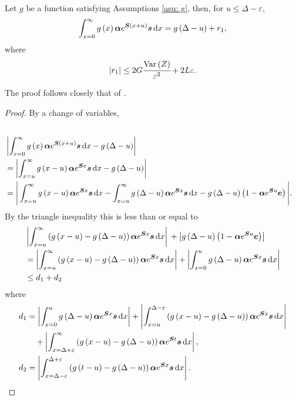 \begin{lem}\label{lemma:bound}
	Let \(g\) be a function satisfying Assumptions \ref{asu: g}, then, for \(u \leq \Delta - \varepsilon\), 
	\begin{align*}
		\int_{x=0}^\infty g\left(x\right)\boldsymbol \alpha e^{\boldsymbol{S}\left(x+u\right)} \boldsymbol s \, \mathrm{d} x = g\left(\Delta-u\right) + r_1,
	\end{align*}
	where 
	\[\left|r_1\right|\leq 2G\cfrac{\mathrm{Var} \left(Z\right)}{\varepsilon^2} + 2L\varepsilon.\]
\end{lem}
The proof follows closely that of \cite[Appendix A, Theorem 4]{hht2020}.
\begin{proof}
	By a change of variables, 
	\begin{align*}
		\\&\left|\int_{x=0}^\infty g\left(x\right)\boldsymbol \alpha  e^{\boldsymbol{S} \left(x+u\right)} \boldsymbol s \, \mathrm{d} x - g\left(\Delta-u\right)\right| 
		\\&= \left|\int_{x=u}^\infty g\left(x-u\right)\boldsymbol \alpha  e^{\boldsymbol{S} x} \boldsymbol s \, \mathrm{d} x - g\left(\Delta-u\right)\right| 
		\\&= \Bigg|\int_{x=u}^\infty g\left(x-u\right)\boldsymbol \alpha  e^{\boldsymbol{S} x} \boldsymbol s \, \mathrm{d} x - \int_{x=u}^\infty g\left(\Delta-u\right)\boldsymbol\alpha  e^{\boldsymbol{S} x}\boldsymbol s\, \mathrm{d} x - g\left(\Delta-u\right)\left(1-\boldsymbol\alpha  e^{\boldsymbol{S} u}\boldsymbol e \right)\Bigg|.
	\end{align*}
	{By the triangle inequality this is less than or equal to}
	\begin{align*}
		&\left|\int_{x=u}^\infty \left(g\left(x-u\right)- g\left(\Delta-u\right)\right)\boldsymbol \alpha  e^{\boldsymbol{S} x} \boldsymbol s \, \mathrm{d} x \right| 
		{}+ \left|g\left(\Delta-u\right)\left(1-\boldsymbol\alpha  e^{\boldsymbol{S} u}\boldsymbol e \right)\right|
		\\&= \left|\int_{x=u}^\infty \left(g\left(x-u\right)- g\left(\Delta-u\right)\right)\boldsymbol \alpha  e^{\boldsymbol{S} x} \boldsymbol s \, \mathrm{d} x\right| 
		+ \left|\int_{x=0}^u g\left(\Delta-u\right)\boldsymbol \alpha  e^{\boldsymbol{S} x} \boldsymbol s \, \mathrm{d} x \right| 
		\\&\leq d_1 +{d_2} 
	\end{align*}
	where 
	\begin{align*}
		d_1 &= \left|\int_{x=0}^u g\left(\Delta-u\right)\boldsymbol \alpha  e^{\boldsymbol{S} x} \boldsymbol s \, \mathrm{d} x\right| + \left|\int_{x=u}^{\Delta-\varepsilon } \left(g\left(x-u\right)- g\left(\Delta-u\right)\right)\boldsymbol \alpha  e^{\boldsymbol{S} x} \boldsymbol s \, \mathrm{d} x \right| 
		\\&\quad{}+ \left|\int_{x=\Delta+\varepsilon }^{\infty} \left(g\left(x-u\right)- g\left(\Delta-u\right)\right)\boldsymbol \alpha  e^{\boldsymbol{S} t} \boldsymbol s \, \mathrm{d} x \right|,
	\\{d_2} &= \left|\int_{x=\Delta-\varepsilon }^{\Delta+\varepsilon } \left(g\left(t-u\right)- g\left(\Delta-u\right)\right)\boldsymbol \alpha  e^{\boldsymbol{S} x} \boldsymbol s \, \mathrm{d} x\right| .
	\end{align*}
	

\end{proof}
